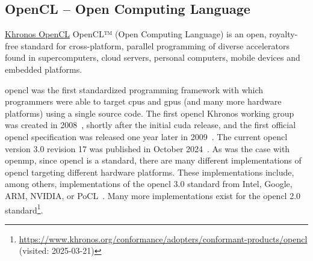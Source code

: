 \subsection{OpenCL -- Open Computing Language}
\label{sec:frameworks:opencl}

\begin{quotebox}{\href{https://www.khronos.org/opencl}{Khronos OpenCL}}
    OpenCL™ (Open Computing Language) is an open, royalty-free standard for cross-platform, parallel programming of diverse accelerators found in supercomputers, cloud servers, personal computers, mobile devices and embedded platforms.
\end{quotebox}

\acrfull{opencl} was the first standardized programming framework with which programmers were able to target \glspl{cpu} and \glspl{gpu} (and many more hardware platforms) using a single source code. 
The first \gls{opencl} Khronos working group was created in 2008~\cite{khronos_opencl_working_group_khronos_2008}, shortly after the initial \gls{cuda} release, and the first official \gls{opencl} specification was released one year later in 2009~\cite{munshi_opencl_2009}. 
The current \gls{opencl} version 3.0 revision 17 was published in October 2024~\cite{khronos_opencl_working_group_opencl_2024}. 
As was the case with \gls{openmp}, since \gls{opencl} is a standard, there are many different implementations of \gls{opencl} targeting different hardware platforms. 
These implementations include, among others, implementations of the \gls{opencl} 3.0 standard from Intel, Google, ARM, NVIDIA, or PoCL~\cite{jaaskelainen_pocl_2015}. 
Many more implementations exist for the \gls{opencl} 2.0 standard\footnote{\url{https://www.khronos.org/conformance/adopters/conformant-products/opencl} (visited: 2025-03-21)}.

